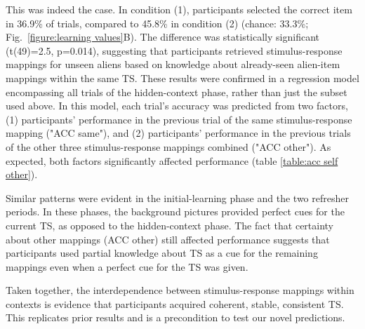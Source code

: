 \documentclass[10pt, letterpaper]{article}
\begin{document}
This was indeed the case. In condition (1), participants selected the correct item in 36.9\% of trials, compared to 45.8\% in condition (2) (chance: 33.3\%; Fig.~\ref{figure:learning values}B). The difference was statistically significant (t(49)=2.5, p=0.014), suggesting that participants retrieved stimulus-response mappings for unseen aliens based on knowledge about already-seen alien-item mappings within the same TS. These results were confirmed in a regression model encompassing all trials of the hidden-context phase, rather than just the subset used above. In this model, each trial's accuracy was predicted from two factors, (1) participants' performance in the previous trial of the same stimulus-response mapping ("ACC same"), and (2) participants' performance in the previous trials of the other three stimulus-response mappings combined ("ACC other"). As expected, both factors significantly affected performance (table \ref{table:acc self other}). 

Similar patterns were evident in the initial-learning phase and the two refresher periods. In these phases, the background pictures provided perfect cues for the current TS, as opposed to the hidden-context phase. The fact that certainty about other mappings (ACC other) still affected performance suggests that participants used partial knowledge about TS as a cue for the remaining mappings even when a perfect cue for the TS was given.

Taken together, the interdependence between stimulus-response mappings within contexts is evidence that participants acquired coherent, stable, consistent TS. This replicates prior results \cite{collins_cognitive_2013} and is a precondition to test our novel predictions.
\end{document}
